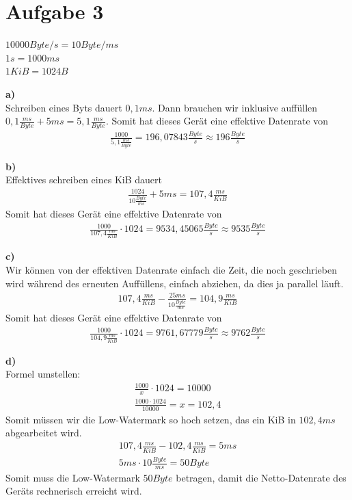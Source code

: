 \documentclass{ti2}
\begin{document}
\section*{Aufgabe 3}
 $10000 Byte/s = 10Byte/ms$\\
 $1s = 1000ms$\\
 $1KiB = 1024B$

\textbf{a)}\\
Schreiben eines Byts dauert $0,1ms$. Dann brauchen wir inklusive auffüllen $0,1\frac{ms}{Byte} + 5ms = 5,1\frac{ms}{Byte}$. Somit hat dieses Gerät eine effektive Datenrate von 
\begin{align*}
	\frac{1000}{5,1\frac{ms}{Byte}}= 196,07843\frac{Byte}{s} \approx 196\frac{Byte}{s}
\end{align*}

\textbf{b)}\\
Effektives schreiben eines KiB dauert 
\begin{align*}
\frac{1024}{10\frac{Byte}{ms}} + 5ms = 107,4\frac{ms}{KiB}
\end{align*}
Somit hat dieses Gerät eine effektive Datenrate von
\begin{align*}
	\frac{1000}{107,4\frac{ms}{KiB}} \cdot 1024 = 9534,45065\frac{Byte}{s} \approx 9535\frac{Byte}{s}
\end{align*}

\textbf{c)}\\
Wir können von der effektiven Datenrate einfach die Zeit, die noch geschrieben wird während des erneuten Auffüllens, einfach abziehen, da dies ja parallel läuft.
\begin{align*}
	107,4\frac{ms}{KiB} - \frac{25ms}{10\frac{Byte}{ms}} = 104,9\frac{ms}{KiB}
\end{align*}
Somit hat dieses Gerät eine effektive Datenrate von
\begin{align*}
\frac{1000}{104,9\frac{ms}{KiB}} \cdot 1024 = 9761,67779\frac{Byte}{s} \approx 9762\frac{Byte}{s}
\end{align*}

\textbf{d)}\\
Formel umstellen:
\begin{align*}
	\frac{1000}{x} \cdot 1024 = 10000\\
	\frac{1000 \cdot 1024}{10000} = x = 102,4
\end{align*}
Somit müssen wir die Low-Watermark so hoch setzen, das ein KiB in $102,4ms$ abgearbeitet wird.
\begin{align*}
	107,4\frac{ms}{KiB} - 102,4\frac{ms}{KiB} = 5ms\\
	5ms \cdot 10\frac{Byte}{ms} = 50Byte
\end{align*}
Somit muss die Low-Watermark $50Byte$ betragen, damit die Netto-Datenrate des Geräts rechnerisch erreicht wird.
\end{document}
